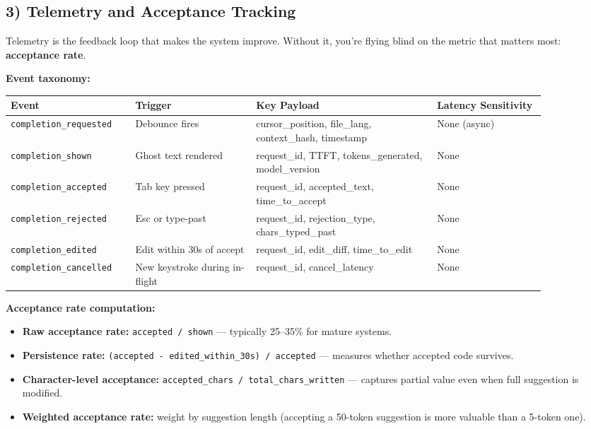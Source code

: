 \subsection*{3) Telemetry and Acceptance Tracking}

Telemetry is the feedback loop that makes the system improve. Without it, you're flying blind on the metric that matters most: \textbf{acceptance rate}.

\textbf{Event taxonomy:}

\begin{tabular}{|p{0.20\linewidth}|p{0.20\linewidth}|p{0.30\linewidth}|p{0.18\linewidth}|}
\hline
\textbf{Event} & \textbf{Trigger} & \textbf{Key Payload} & \textbf{Latency Sensitivity} \\
\hline
\texttt{completion\_requested} & Debounce fires & cursor\_position, file\_lang, context\_hash, timestamp & None (async) \\
\hline
\texttt{completion\_shown} & Ghost text rendered & request\_id, TTFT, tokens\_generated, model\_version & None \\
\hline
\texttt{completion\_accepted} & Tab key pressed & request\_id, accepted\_text, time\_to\_accept & None \\
\hline
\texttt{completion\_rejected} & Esc or type-past & request\_id, rejection\_type, chars\_typed\_past & None \\
\hline
\texttt{completion\_edited} & Edit within 30s of accept & request\_id, edit\_diff, time\_to\_edit & None \\
\hline
\texttt{completion\_cancelled} & New keystroke during in-flight & request\_id, cancel\_latency & None \\
\hline
\end{tabular}

\textbf{Acceptance rate computation:}

\begin{itemize}
  \item \textbf{Raw acceptance rate:} \texttt{accepted / shown} --- typically 25--35\% for mature systems.
  \item \textbf{Persistence rate:} \texttt{(accepted - edited\_within\_30s) / accepted} --- measures whether accepted code survives.
  \item \textbf{Character-level acceptance:} \texttt{accepted\_chars / total\_chars\_written} --- captures partial value even when full suggestion is modified.
  \item \textbf{Weighted acceptance rate:} weight by suggestion length (accepting a 50-token suggestion is more valuable than a 5-token one).
\end{itemize}

